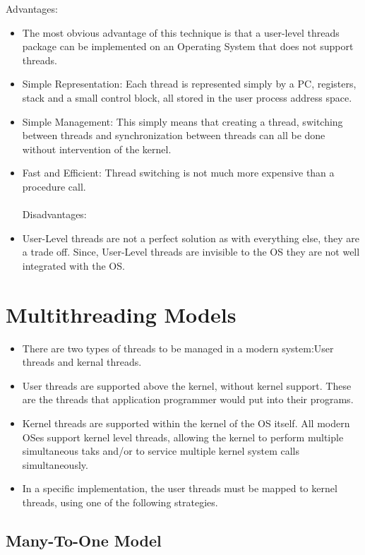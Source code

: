 \documentclass[12pt]{extarticle}
\begin{document}
Advantages:

\begin{itemize}
    \item The most obvious advantage of this technique is that a user-level threads package can be implemented on an Operating System that does not support threads. 
    \item Simple Representation: Each thread is represented simply by a PC, registers, stack and a small control block, all stored in the user process address space. 
    \item Simple Management:  This simply means that creating a thread, switching between threads and synchronization between threads can all be done without intervention of the kernel. 
    \item Fast and Efficient:  Thread switching is not much more expensive than a procedure call.  \\ \\
    Disadvantages:
    \item User-Level threads are not a perfect solution as with everything else, they are a trade off. Since, User-Level threads are invisible to the OS they are not well integrated with the OS.
\end{itemize}


\section{Multithreading Models}

\begin{itemize}
    \item There are two types of threads to be managed in a modern system:User threads and kernal threads.
    \item User threads are supported above the kernel, without kernel support. These are the threads that application programmer would put into their programs.
    \item Kernel threads are supported within the kernel of the OS itself. All modern OSes support kernel level threads, allowing the kernel to perform multiple simultaneous taks and/or to service multiple kernel system calls simultaneously.
    \item In a specific implementation, the user threads must be mapped to kernel threads, using one of the following strategies.
\end{itemize}

\subsection{Many-To-One Model}
\end{document}
